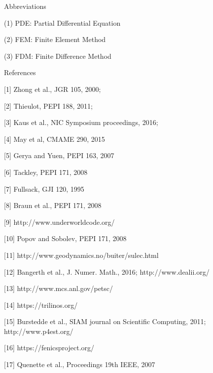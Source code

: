 \vspace{3mm}

\noindent Abbreviations

(1) PDE: Partial Differential Equation 

(2) FEM: Finite Element Method 

(3) FDM: Finite Difference Method

\noindent References

[1] Zhong et al., JGR 105, 2000; 

[2] Thieulot, PEPI 188, 2011; 

[3] Kaus et al., NIC Symposium proceedings, 2016; 

[4] May et al, CMAME 290, 2015 

[5] Gerya and Yuen, PEPI 163, 2007 

[6] Tackley, PEPI 171, 2008 

[7] Fullsack, GJI 120, 1995 

[8] Braun et al., PEPI 171, 2008 

[9] http://www.underworldcode.org/ 

[10] Popov and Sobolev, PEPI 171, 2008 

[11] http://www.geodynamics.no/buiter/sulec.html 

[12] Bangerth et al., J. Numer. Math., 2016; http://www.dealii.org/ 

[13] http://www.mcs.anl.gov/petsc/ 

[14] https://trilinos.org/ 

[15] Burstedde et al., SIAM journal on Scientific Computing, 2011; http://www.p4est.org/ 

[16] https://fenicsproject.org/ 

[17] Quenette et al., Proceedings 19th IEEE, 2007





